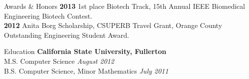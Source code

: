 \documentclass{resume} %
\begin{document}

\begin{rSection}{Awards \& Honors}
{\bf 2013} 1st place Biotech Track, 15th Annual IEEE Biomedical Engineering Biotech Contest. \\
{\bf 2012} Anita Borg Scholarship, CSUPERB Travel Grant, Orange County Outstanding Engineering Student Award. \\
\end{rSection}


\begin{rSection}{Education}
{\bf California State University, Fullerton}  \\ 
M.S. Computer Science \hfill {\em August 2012}\\
B.S. Computer Science, Minor Mathematics  \hfill {\em July 2011}\\
\end{rSection}






\end{document}
